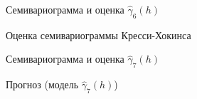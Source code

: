 \begin{figure}[H]
\caption{Семивариограмма и оценка $ \widehat{\gamma}_6(h) $}
\label{img:per-cv-modeled}
\end{figure}

\begin{figure}[H]
\caption{Оценка семивариограммы Кресси-Хокинса}
\label{img:robust-variogram}
\end{figure}

\begin{figure}[H]
\caption{Семивариограмма и оценка $ \widehat{\gamma}_7(h) $}
\label{img:auto-class-modeled}
\end{figure}

\begin{figure}[H]
\caption{Прогноз (модель $ \widehat{\gamma}_7(h) $)}
\label{img:auto-class-20-pred}
\end{figure}

